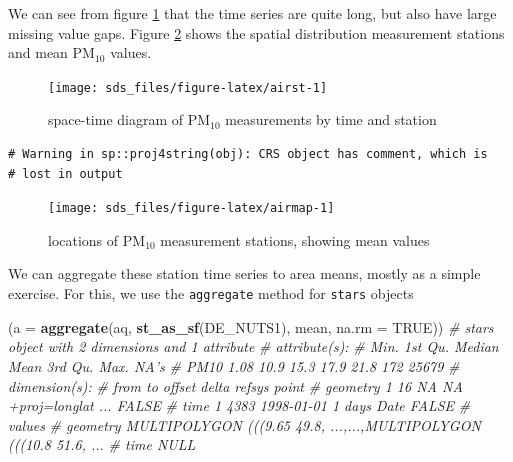 \documentclass[]{book}
\newenvironment{Shaded}{\begin{snugshade}}{\end{snugshade}}
\newcommand{\CommentTok}[1]{\textcolor[rgb]{0.56,0.35,0.01}{\textit{#1}}}
\newcommand{\DataTypeTok}[1]{\textcolor[rgb]{0.13,0.29,0.53}{#1}}
\newcommand{\KeywordTok}[1]{\textcolor[rgb]{0.13,0.29,0.53}{\textbf{#1}}}
\newcommand{\NormalTok}[1]{#1}
\newcommand{\OtherTok}[1]{\textcolor[rgb]{0.56,0.35,0.01}{#1}}
\begin{document}
We can see from figure \ref{fig:airst} that the time series are
quite long, but also have large missing value gaps.
Figure \ref{fig:airmap} shows the spatial distribution measurement stations and
mean PM\(_{10}\) values.

\begin{figure}

{\centering \texttt{[image: sds\_files/figure-latex/airst-1]} 

}

\caption{space-time diagram of PM$_{10}$ measurements by time and station}\label{fig:airst}
\end{figure}

\begin{verbatim}
# Warning in sp::proj4string(obj): CRS object has comment, which is
# lost in output
\end{verbatim}

\begin{figure}

{\centering \texttt{[image: sds\_files/figure-latex/airmap-1]} 

}

\caption{locations of PM$_{10}$ measurement stations, showing mean values}\label{fig:airmap}
\end{figure}

We can aggregate these station time series to area means, mostly
as a simple exercise. For this, we use the \texttt{aggregate} method for
\texttt{stars} objects

\begin{Shaded}
\begin{Highlighting}[]
\NormalTok{(}\DataTypeTok{a =} \KeywordTok{aggregate}\NormalTok{(aq, }\KeywordTok{st_as_sf}\NormalTok{(DE_NUTS1), mean, }\DataTypeTok{na.rm =} \OtherTok{TRUE}\NormalTok{))}
\CommentTok{# stars object with 2 dimensions and 1 attribute}
\CommentTok{# attribute(s):}
\CommentTok{#       Min. 1st Qu. Median Mean 3rd Qu. Max.  NA's}
\CommentTok{# PM10  1.08    10.9   15.3 17.9    21.8  172 25679}
\CommentTok{# dimension(s):}
\CommentTok{#          from   to     offset  delta            refsys point}
\CommentTok{# geometry    1   16         NA     NA +proj=longlat ... FALSE}
\CommentTok{# time        1 4383 1998-01-01 1 days              Date FALSE}
\CommentTok{#                                                                     values}
\CommentTok{# geometry MULTIPOLYGON (((9.65 49.8, ...,...,MULTIPOLYGON (((10.8 51.6, ...}
\CommentTok{# time                                                                  NULL}
\end{Highlighting}
\end{Shaded}
\end{document}
